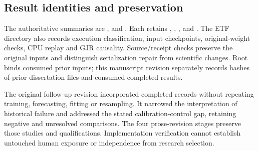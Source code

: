 \subsection{Result identities and preservation}

The authoritative summaries are ,  and . Each retains , , ,  and . The ETF directory also records execution classification, input checkpoints, original-weight checks, CPU replay and GJR causality. Source/receipt checks preserve the original inputs and distinguish serialization repair from scientific changes. Root  binds consumed prior inputs; this manuscript revision separately records hashes of prior dissertation files and consumed completed results.

The original follow-up revision incorporated completed records without repeating training, forecasting, fitting or resampling. It narrowed the interpretation of historical failure and addressed the stated calibration-control gap, retaining negative and unresolved comparisons. The four prose-revision stages preserve those studies and qualifications. Implementation verification cannot establish untouched human exposure or independence from research selection.

